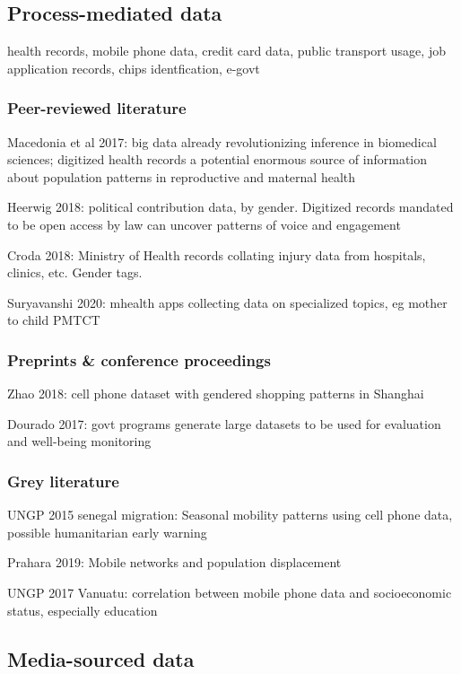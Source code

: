 \documentclass{article}
\begin{document}
\subsection{Process-mediated data}

health records, mobile phone data, credit card data, public transport usage, job application records, chips identfication, e-govt



\subsubsection{Peer-reviewed literature}

Macedonia et al 2017: big data already revolutionizing inference in biomedical sciences; digitized health records a potential enormous source of information about population patterns in reproductive and maternal health   

Heerwig 2018: political contribution data, by gender. Digitized records mandated to be open access by law can uncover patterns of voice and engagement

Croda 2018: Ministry of Health records collating injury data from hospitals, clinics, etc. Gender tags.


Suryavanshi 2020: mhealth apps collecting data on specialized topics, eg mother to child PMTCT


\subsubsection{Preprints \& conference proceedings}

Zhao 2018: cell phone dataset with gendered shopping patterns in Shanghai

Dourado 2017: govt programs generate large datasets to be used for evaluation and well-being monitoring


\subsubsection{Grey literature}

UNGP 2015 senegal migration: Seasonal mobility patterns using cell phone data, possible humanitarian early warning

Prahara 2019: Mobile networks and population displacement

UNGP 2017 Vanuatu: correlation between mobile phone data and socioeconomic status, especially education

\subsection{Media-sourced data}
\end{document}
